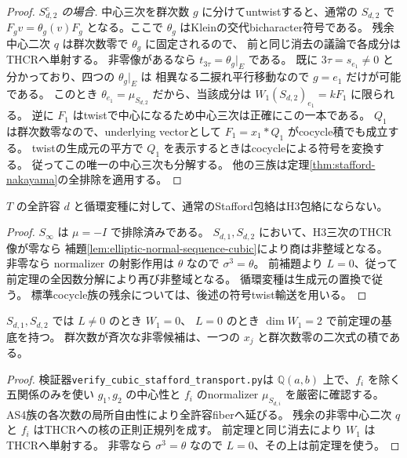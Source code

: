 \begin{proof}
\emph{$S_{d,2}^c$ の場合.}
中心三次を群次数 $g$ に分けてuntwistすると、通常の $S_{d,2}$ で
$F_gv=\theta_g(v)F_g$ となる。ここで $\theta_g$ はKleinの交代bicharacter符号である。
残余中心二次 $q$ は群次数零で $\theta_g$ に固定されるので、
前と同じ消去の議論で各成分はTHCRへ単射する。
非零像があるなら $t_{3\tau}=\theta_g|_E$ である。
既に $3\tau=s_{e_1}\ne0$ と分かっており、四つの $\theta_g|_E$ は
相異なる二捩れ平行移動なので $g=e_1$ だけが可能である。
このとき $\theta_{e_1}=\mu_{S_{d,2}}$ だから、当該成分は
$W_1(S_{d,2})_{e_1}=kF_1$ に限られる。
逆に $F_1$ はtwistで中心になるため中心三次は正確にこの一本である。
$Q_1$ は群次数零なので、underlying vectorとして
$F_1=x_1*Q_1$ がcocycle積でも成立する。
twistの生成元の平方で $Q_1$ を表示するときはcocycleによる符号を変換する。
従ってこの唯一の中心三次も分解する。
他の三族は定理\ref{thm:stafford-nakayama}の全排除を適用する。
\end{proof}

\begin{corollary}[通常のStafford包絡の全排除]
\label{cor:all-ordinary-stafford-excluded}
$T$ の全許容 $d$ と循環変種に対して、通常のStafford包絡はH3包絡にならない。
\end{corollary}
\begin{proof}
$S_\infty$ は $\mu=-I$ で排除済みである。
$S_{d,1},S_{d,2}$ において、H3三次のTHCR像が零なら
補題\ref{lem:elliptic-normal-sequence-cubic}により商は非整域となる。
非零なら normalizer の射影作用は $\theta$ なので $\sigma^3=\theta$。
前補題より $L=0$、従って前定理の全因数分解により再び非整域となる。
循環変種は生成元の置換で従う。
標準cocycle族の残余については、後述の符号twist輸送を用いる。
\end{proof}

\begin{proposition}[通常Stafford族の全三次incidence]
\label{prop:stafford-exact-W1-support}
$S_{d,1},S_{d,2}$ では $L\ne0$ のとき $W_1=0$、
$L=0$ のとき $\dim W_1=2$ で前定理の基底を持つ。
群次数が斉次な非零候補は、一つの $x_j$ と群次数零の二次式の積である。
\end{proposition}
\begin{proof}
検証器\texttt{verify\_cubic\_stafford\_transport.py}は
$\mathbb Q(a,b)$ 上で、$f_i$ を除く五関係のみを使い
$g_1,g_2$ の中心性と $f_i$ のnormalizer $\mu_{S_{d,i}}$ を厳密に確認する。
AS4族の各次数の局所自由性により全許容fiberへ延びる。
残余の非零中心二次 $q$ と $f_i$ はTHCRへの核の正則正規列を成す。
前定理と同じ消去により $W_1$ はTHCRへ単射する。
非零なら $\sigma^3=\theta$ なので $L=0$、その上は前定理を使う。
\end{proof}

